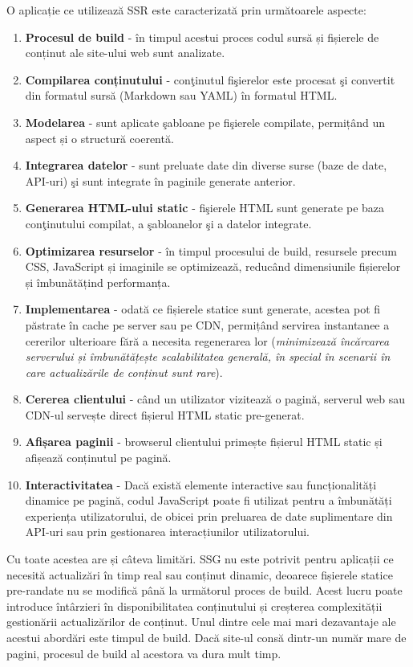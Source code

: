 \documentclass[12pt, a4paper]{report}
\begin{document}
O aplicație ce utilizează SSR este caracterizat\u a prin următoarele aspecte:
\begin{enumerate}
	\item \textbf{Procesul de build} - \^in timpul acestui proces codul sursă și fișierele de conținut ale site-ului web sunt analizate.
	\item \textbf{Compilarea conținutului} - con\c tinutul fi\c sierelor este procesat \c si convertit din formatul sursă (Markdown sau YAML) în formatul HTML.
	\item \textbf{Modelarea} - sunt aplicate \c sabloane pe fi\c sierele compilate, permițând un aspect și o structură coerent\u a.
	\item \textbf{Integrarea datelor} - sunt preluate date din diverse surse (baze de date, API-uri) \c si sunt integrate în paginile generate anterior.
	\item \textbf{Generarea HTML-ului static} - fi\c sierele HTML sunt generate pe baza con\c tinutului compilat, a \c sabloanelor \c si a datelor integrate.
	\item \textbf{Optimizarea resurselor} - \^in timpul procesului de build, resursele precum CSS, JavaScript și imaginile se optimizeaz\u a, reducând dimensiunile fișierelor și îmbunătățind performanța.
	\item \textbf{Implementarea} -  odată ce fișierele statice sunt generate, acestea pot fi păstrate în cache pe server sau pe CDN, permițând servirea instantanee a cererilor ulterioare fără a necesita regenerarea lor (\textit{minimizează încărcarea serverului și îmbunătățește scalabilitatea generală, în special în scenarii în care actualizările de conținut sunt rare}).
	\item \textbf{Cererea clientului} -  când un utilizator vizitează o pagină, serverul web sau CDN-ul servește direct fișierul HTML static pre-generat.
	\item \textbf{Afișarea paginii} - browserul clientului primește fișierul HTML static și afișează conținutul pe pagină.
	\item \textbf{Interactivitatea} - Dacă există elemente interactive sau funcționalități dinamice pe pagină, codul JavaScript poate fi utilizat pentru a îmbunătăți experiența utilizatorului, de obicei prin preluarea de date suplimentare din API-uri sau prin gestionarea interacțiunilor utilizatorului.
\end{enumerate}

Cu toate acestea are și câteva limitări. SSG nu este potrivit pentru aplicații ce necesită actualizări în timp real sau conținut dinamic, deoarece fișierele statice pre-randate nu se modifică până la următorul proces de build. Acest lucru poate introduce întârzieri în disponibilitatea conținutului și creșterea complexității gestionării actualizărilor de conținut. \cite{rendering-patterns}
Unul dintre cele mai mari dezavantaje ale acestui abordări este timpul de build. Dacă site-ul cons\u a dintr-un num\u ar mare de pagini, procesul de build al acestora va dura mult timp.
\end{document}
